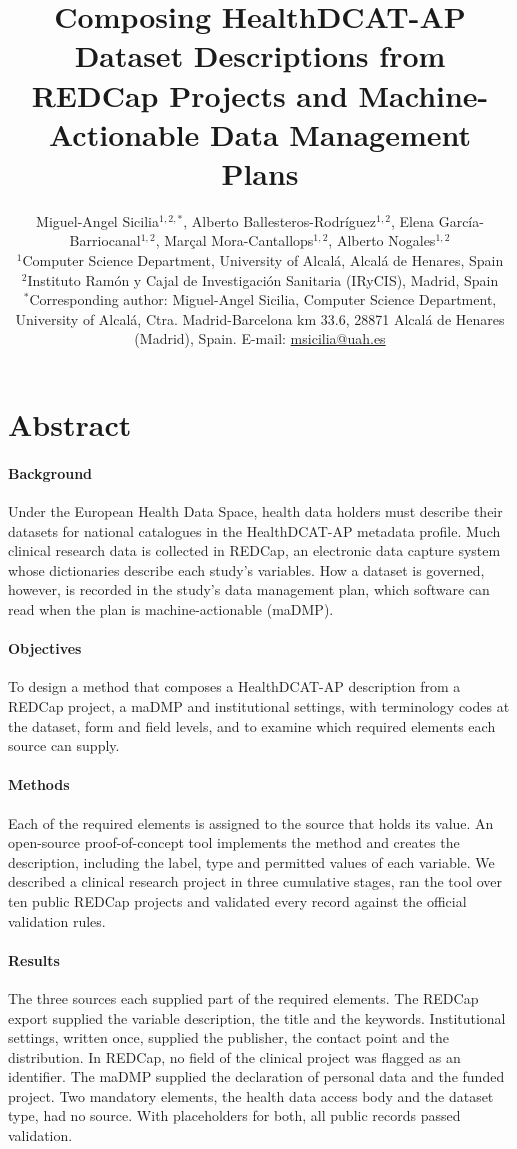 \documentclass[12pt]{article}
\title{Composing HealthDCAT-AP Dataset Descriptions from REDCap Projects and
Machine-Actionable Data Management Plans}
\author{\parbox{\textwidth}{\centering\singlespacing
Miguel-Angel Sicilia$^{1,2,*}$, Alberto Ballesteros-Rodr\'iguez$^{1,2}$,
Elena Garc\'ia-Barriocanal$^{1,2}$, Mar\c{c}al Mora-Cantallops$^{1,2}$,
Alberto Nogales$^{1,2}$\\[1ex]
\small $^1$Computer Science Department, University of Alcal\'a, Alcal\'a de Henares,
Spain\\
$^2$Instituto Ram\'on y Cajal de Investigaci\'on Sanitaria (IRyCIS), Madrid,
Spain\\[1ex]
$^*$Corresponding author: Miguel-Angel Sicilia, Computer Science Department,
University of Alcal\'a, Ctra. Madrid-Barcelona km 33.6, 28871 Alcal\'a de Henares
(Madrid), Spain. E-mail: \href{mailto:msicilia@uah.es}{msicilia@uah.es}}}
\date{}
\newif\ifrevision \revisiontrue
\begin{document}
\newcommand{\FigOneCaption}{Architecture of the method. Square boxes are inputs and
outputs; rounded boxes are processing steps.}
\maketitle

\section*{Abstract}

\paragraph{Background} Under the European Health Data Space, health data holders must
describe their datasets for national catalogues in the HealthDCAT-AP metadata profile.
Much clinical research data is collected in REDCap, an electronic data capture system
whose dictionaries describe each study's variables. How a dataset is governed, however,
is recorded in the study's data management plan, which software can read when the plan
is machine-actionable (maDMP).

\paragraph{Objectives} To design a method that composes a HealthDCAT-AP description from
a REDCap project, a maDMP and institutional settings, with terminology codes at the
dataset, form and field levels, and to examine which required elements each source can
supply.

\paragraph{Methods} Each of the required elements is assigned to the source that holds its
value. An open-source proof-of-concept tool implements the method and creates the
description, including the label, type and permitted values of each variable. We described a clinical
research project in three cumulative stages, ran the tool over ten public REDCap
projects and validated every record against the official
validation rules.

\paragraph{Results} The three sources each supplied part of the required
elements. The REDCap export supplied the variable description,
the title and the keywords. Institutional settings, written once, supplied the
publisher, the contact point and the distribution. In REDCap, no field of the clinical project was flagged as an
identifier. The maDMP supplied the declaration of personal data and the funded project. Two mandatory elements, the health data access
body and the dataset type, had no source. With placeholders for both, all public records passed validation.
\end{document}
